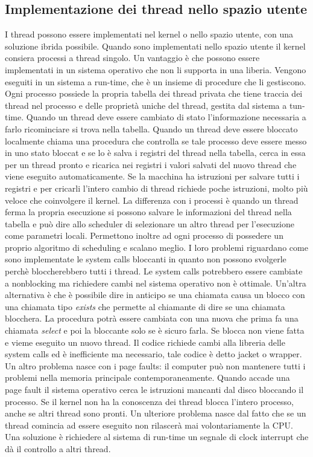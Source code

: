 \subsection{Implementazione dei thread nello spazio utente}
I thread possono essere implementati nel kernel o nello spazio utente, con una soluzione ibrida possibile. Quando sono implementati nello spazio utente il kernel consiera processi a 
thread singolo. Un vantaggio \`e che possono essere implementati in un sistema operativo che non li supporta in una liberia. Vengono eseguiti in un sistema a run-time, che \`e un insieme
di procedure che li gestiscono. Ogni processo possiede la propria tabella dei thread privata che tiene traccia dei thread nel processo e delle propriet\`a uniche del thread, gestita dal
sistema a tun-time. Quando un thread deve essere cambiato di stato l'informazione necessaria a farlo ricominciare si trova nella tabella. Quando un thread deve essere bloccato localmente
chiama una procedura che controlla se tale processo deve essere messo in uno stato bloccat e se lo \`e salva i registri del thread nella tabella, cerca in essa per un thread pronto e 
ricarica nei registri i valori salvati del nuovo thread che viene eseguito automaticamente. Se la macchina ha istruzioni per salvare tutti i registri e per cricarli l'intero cambio di 
thread richiede poche istruzioni, molto pi\`u veloce che coinvolgere il kernel. La differenza con i processi \`e quando un thread ferma la propria esecuzione si possono salvare le 
informazioni del thread nella tabella e pu\`o dire allo scheduler di selezionare un altro thread per l'esecuzione come parametri locali. Permettono inoltre ad ogni processo di possedere
un proprio algoritmo di scheduling e scalano meglio. I loro problemi riguardano come sono implementate le system calls bloccanti in quanto non possono svolgerle perch\`e bloccherebbero
tutti i thread. Le system calls potrebbero essere cambiate a nonblocking ma richiedere cambi nel sistema operativo non \`e ottimale. Un'altra alternativa \`e che \`e possibile dire in
anticipo se una chiamata causa un blocco con una chiamata tipo \emph{exists} che permette al chiamante di dire se una chiamata blocchera. La procedura potr\`a essere cambiata con una 
nuova che prima fa una chiamata \emph{select} e poi la bloccante solo se \`e sicuro farla. Se blocca non viene fatta e vieme eseguito un nuovo thread. Il codice richiede cambi alla 
libreria delle system calls ed \`e inefficiente ma necessario, tale codice \`e detto jacket o wrapper. Un altro problema nasce con i page faults: il computer pu\`o non mantenere tutti i 
problemi nella memoria principale contemporaneamente. Quando accade una page fault il sistema operativo cerca le istruzioni mancanti dal disco bloccando il processo. Se il kernel non
ha la conoscenza dei thread blocca l'intero processo, anche se altri thread sono pronti. Un ulteriore problema nasce dal fatto che se un thread comincia ad essere eseguito non 
rilascer\`a mai volontariamente la CPU. Una soluzione \`e richiedere al sistema di run-time un segnale di clock interrupt che d\`a il controllo a altri thread. 
